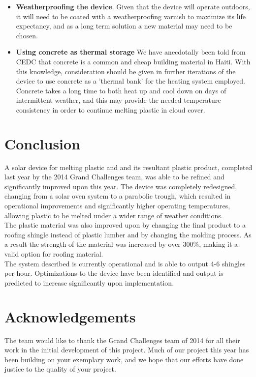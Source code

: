 \documentclass[11pt,english]{article}
\begin{document}
\begin{itemize}
\item \textbf{Weatherproofing the device}. Given that the device will operate outdoors, it will need to be coated with a weatherproofing varnish to maximize its life expectancy, and as a long term solution a new material may need to be chosen. 
\item \textbf{Using concrete as thermal storage} We have anecdotally been told from CEDC that concrete is a common and cheap building material in Haiti. With this knowledge, consideration should be given in further iterations of the device to use concrete as a 'thermal bank' for the heating system employed. Concrete takes a long time to both heat up and cool down on days of intermittent weather, and this may provide the needed temperature consistency in order to continue melting plastic in cloud cover. 

\end{itemize}

\pagebreak
\section{Conclusion}
A solar device for melting plastic and and its resultant plastic product, completed last year by the 2014 Grand Challenges team, was able to be refined and significantly improved upon this year. The device was completely redesigned, changing from a solar oven system to a parabolic trough, which resulted in operational improvements and significantly higher operating temperatures, allowing plastic to be melted under a wider range of weather conditions.\\

\noindent The plastic material was also improved upon by changing the final product to a roofing shingle instead of plastic lumber and by changing the molding process. As a result the strength of the material was increased by over 300\%, making it a valid option for roofing material. \\

\noindent The system described is currently operational and is able to output 4-6 shingles per hour. Optimizations to the device have been identified and output is predicted to increase significantly upon implementation.


\newpage
\section{Acknowledgements}
The team would like to thank the Grand Challenges team of 2014 for all their work in the initial development of this project. Much of our project this year has been building on your exemplary work, and we hope that our efforts have done justice to the quality of your project.\\
\end{document}
